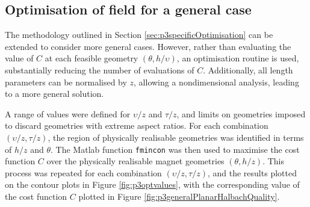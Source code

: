 \subsection{Optimisation of field for a general case}
The methodology outlined in Section \ref{sec:p3specificOptimisation} can be extended to consider more general cases. However, rather than evaluating the value of \(C\) at each feasible geometry \(\left( \theta, h/\upsilon \right)\), an optimisation routine is used, substantially reducing the number of evaluations of \(C\). Additionally, all length parameters can be normalised by \(z\), allowing a nondimensional analysis, leading to a more general solution.

A range of values were defined for \(\upsilon/z\) and \(\tau/z\), and limits on geometries imposed to discard geometries with extreme aspect ratios. For each combination \(\left( \upsilon/z, \tau/z\right)\), the region of physically realisable geometries was identified in terms of \(h/z\) and \(\theta\). The Matlab function \texttt{fmincon} was then used to maximise the cost function \(C\) over the physically realisable magnet geometries \(\left(\theta, h/z\right)\). This process was repeated for each combination \(\left( \upsilon/z, \tau/z\right)\), and the results plotted on the contour plots in Figure \ref{fig:p3optvalues}, with the corresponding value of the cost function \(C\) plotted in Figure \ref{fig:p3generalPlanarHalbachQuality}.
